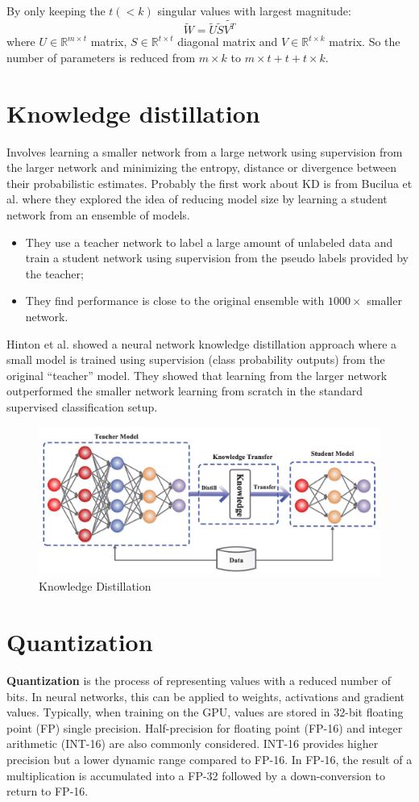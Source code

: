 By only keeping the $t(< k)$ singular values with largest magnitude:
\begin{equation*}
    \tilde{W} = \tilde{U} \tilde{S} \tilde{V^T}
\end{equation*}
where $U \in \mathbb{R}^{m \times t}$ matrix, $S \in \mathbb{R}^{t \times t}$
diagonal matrix and $V \in \mathbb{R}^{t \times k}$ matrix. So the number of
parameters is reduced from $m \times k$ to $m \times t + t + t \times k$.
\section{Knowledge distillation}
Involves learning a smaller network from a large network using supervision from
the larger network and minimizing the entropy, distance or divergence between
their probabilistic estimates. Probably the first work about KD is from Bucilua
et al. where they explored the idea of reducing model size by learning a student
network from an ensemble of models.
\begin{itemize}
    \item They use a teacher network to label a large amount of unlabeled data
          and train a student network using supervision from the pseudo labels
          provided by the teacher;
    \item They find performance is close to the original ensemble with $1000 \times$
          smaller network.
\end{itemize}

Hinton et al. showed a neural network knowledge distillation approach where a
small model is trained using supervision (class probability outputs) from the
original “teacher” model. They showed that learning from the larger network
outperformed the smaller network learning from scratch in the standard supervised
classification setup.

\begin{figure}[!ht]
    \centering
    \includegraphics[width=0.5\linewidth]{img/ModelCompression/KnowledgeDistillation.png}
    \caption{Knowledge Distillation}
    \label{fig:knowledgeDistillation}
\end{figure}

\section{Quantization}
\textbf{Quantization} is the process of representing values with a reduced number
of bits. In neural networks, this can be applied to weights, activations and
gradient values. Typically, when training on the GPU, values are stored in 32-bit
floating point (FP) single precision. Half-precision for floating point (FP-16)
and integer arithmetic (INT-16) are also commonly considered. INT-16 provides
higher precision but a lower dynamic range compared to FP-16. In FP-16, the result
of a multiplication is accumulated into a FP-32 followed by a down-conversion to
return to FP-16.

